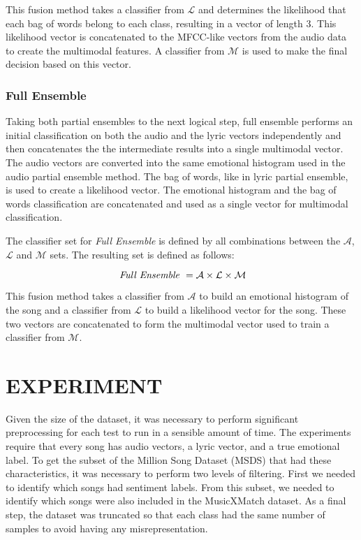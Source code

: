 This fusion method takes a classifier from $\mathcal{L}$ and determines the likelihood that each bag of words belong to each class, resulting
in a vector of length 3. This likelihood vector is concatenated to the MFCC-like vectors from the audio data to create the multimodal features. 
A classifier from $\mathcal{M}$ is used to make the final decision based on this vector. 

\subsection*{Full Ensemble}

Taking both partial ensembles to the next logical step, full ensemble performs an initial classification on both the audio and the lyric vectors independently and then concatenates the 
the intermediate results into a single multimodal vector. The audio vectors are converted into the same emotional histogram used in the audio partial
ensemble method. The bag of words, like in lyric partial ensemble, is used to create a likelihood vector. The emotional histogram and the bag of words classification are concatenated
and used as a single vector for multimodal classification.

The classifier set for \textit{Full Ensemble} is defined by all combinations between the  $\mathcal{A}$,  $\mathcal{L}$ and  $\mathcal{M}$ sets. The resulting set is 
defined as follows:

\[ \text{ \textit{Full Ensemble} } = \mathcal{A} \times  \mathcal{L} \times  \mathcal{M}\]


This fusion method takes a classifier from $\mathcal{A}$ to build an emotional histogram of the song and a classifier from  $\mathcal{L}$ to build a likelihood vector for the song. 
These two vectors are concatenated to form the multimodal vector used to train a classifier from  $\mathcal{M}$.

\chapter{EXPERIMENT}

Given the size of the dataset, it was necessary to perform significant preprocessing for each test to run in a sensible amount of time. The experiments require that every song has audio vectors, a lyric vector, and a true emotional label. To get the subset of the Million Song Dataset (MSDS) that had these characteristics, it was necessary to perform two levels of filtering. First we needed to identify which songs had sentiment labels. From this subset, we needed to identify which songs were also included in the MusicXMatch dataset. As a final step, the dataset was truncated so that each class had the same number of samples to avoid having any misrepresentation. 

